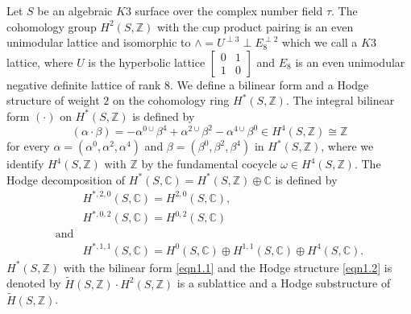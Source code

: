 Let $S$ be an algebraic $K3$ surface over the complex number field
$\tau$. The cohomology group $H^{2}(S,\mathbb{Z})$ with the cup
product pairing is an even unimodular lattice and isomorphic to
$\wedge=U^{\perp 3}\perp E^{\perp 2}_8$ which we call a $K3$ lattice,
where $U$ is the hyperbolic lattice $\begin{bmatrix}
0 & 1\\
1 & 0\end{bmatrix}$ and $E_8$ is an even unimodular negative definite
lattice of rank $8$. We define a bilinear form and a Hodge structure
of weight $2$ on the cohomology ring $H^{\ast}(S,\mathbb{Z})$. The
integral bilinear form $(\cdot)$ on $H^{\ast}(S,\mathbb{Z})$ is
defined by 
\begin{equation}\label{eqn1.1}
(\alpha\cdot\beta)=-\alpha^{0
    \cup}\beta^{4}+\alpha^{2\cup}\beta^{2}-\alpha^{4\cup}\beta^{0}\in H^{4}(S,\mathbb{Z})\cong\mathbb{Z}
\end{equation}
for every $\alpha=\left(\alpha^{0}, \alpha^{2},\alpha^{4}\right)$ and
$\beta=\left(\beta^{0}, \beta^{2}, \beta^{4}\right)$ in
$H^{\ast}(S,\mathbb{Z})$, where we identify $H^{4}(S,\mathbb{Z})$ with
$\mathbb{Z}$ by the fundamental cocycle $\omega\in
H^{4}(S,\mathbb{Z})$. The Hodge decomposition of
$H^{\ast}(S,\mathbb{C})=H^{\ast}(S,\mathbb{Z})\oplus \mathbb{C}$ is
defined by 
\begin{equation}\label{eqn1.2}
\begin{aligned}
&H^{\ast, 2, 0}(S,\mathbb{C})=H^{2,0}(S,\mathbb{C}),\\
&{}H^{\ast, 0, 2}(S,\mathbb{C})=H^{0,2}(S,\mathbb{C})\\
\text{and}\\
&{}H^{\ast,1,1}(S,\mathbb{C})=H^{0}(S,\mathbb{C})\oplus
  H^{1,1}(S,\mathbb{C})\oplus H^{4}(S,\mathbb{C}).
\end{aligned}
\end{equation}
$H^{\ast}(S,\mathbb{Z})$ with the bilinear form \eqref{eqn1.1} and the
Hodge structure \eqref{eqn1.2} is denoted by
$\widetilde{H}(S,\mathbb{Z})\cdot H^{2}(S,\mathbb{Z})$ is a sublattice
and a Hodge substructure of $\widetilde{H}(S,\mathbb{Z})$. 

